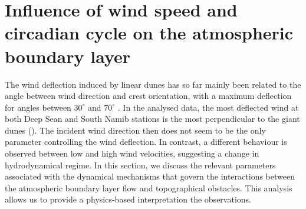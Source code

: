 \section{Influence of wind speed and circadian cycle on the atmospheric boundary layer}
The wind deflection induced by linear dunes has so far mainly been related to the angle between wind direction and crest orientation, with a maximum deflection for angles between $30^{\circ}$ and $70^{\circ}$ \citep{Walker2009, Hesp2015}. In the analysed data, the most deflected wind at both Deep Sean and South Namib stations is the most perpendicular to the giant dunes (). The incident wind direction then does not seem to be the only parameter controlling the wind deflection. In contrast, a different behaviour is observed between low and high wind velocities, suggesting a change in hydrodynamical regime. In this section, we discuss the relevant parameters associated with the dynamical mechanisms that govern the interactions between the atmospheric boundary layer flow and topographical obstacles. This analysis allows us to provide a physics-based interpretation the observations.


